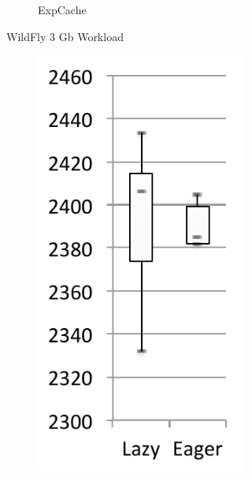 \documentclass[sigplan,10pt,screen]{acmart}\settopmatter{printfolios=true,printccs=true,printacmref=true}
\begin{document}
\begin{figure}[bth]
\begin{subfigure}[b]{.48\textwidth}
\begin{subfigure}[b]{.28\textwidth}
		\caption{ExpCache}
	\end{subfigure}%
	\caption*{WildFly 3 Gb Workload\vspace{-0cm}}
	\end{subfigure}%
	\begin{subfigure}[b]{.48\textwidth}
    	\hspace{.03\textwidth}\begin{subfigure}[b]{.28\textwidth}
    		\includegraphics[width=\linewidth]{figures/wildflyLoadExecTime} 

\end{subfigure}
\end{subfigure}
\end{figure}
\end{document}
